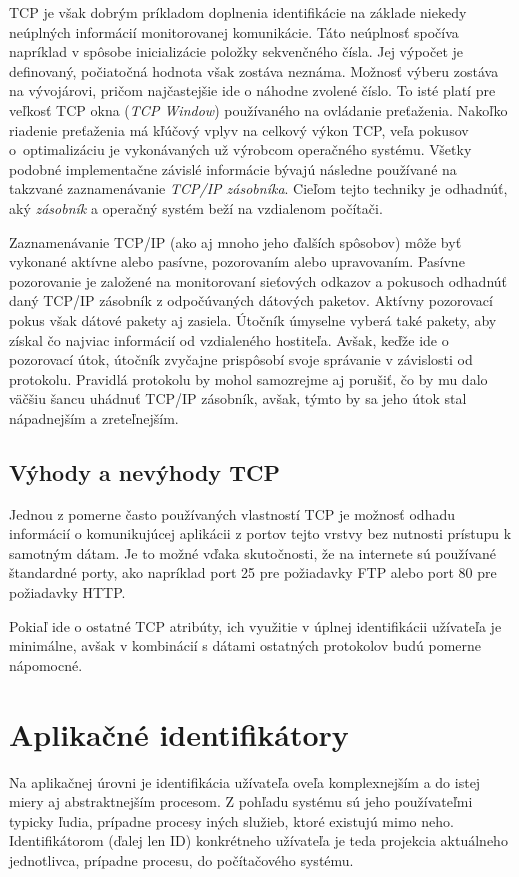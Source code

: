\documentclass[
  digital, %
  table,   %
  lof,     %
  nolot,   %
  nocover
]{fithesis3}
\begin{document}
TCP je však dobrým príkladom doplnenia identifikácie na základe niekedy neúplných
informácií monitorovanej komunikácie. Táto neúplnosť spočíva napríklad v
spôsobe inicializácie položky sekvenčného čísla. Jej výpočet je definovaný,
počiatočná hodnota však zostáva neznáma. Možnosť výberu zostáva na vývojárovi,
pričom najčastejšie ide o náhodne zvolené číslo. To isté platí pre veľkosť TCP
okna (\textit{TCP Window}) používaného na ovládanie preťaženia. Nakoľko
riadenie preťaženia má kľúčový vplyv na celkový výkon TCP, veľa pokusov
o~optimalizáciu je vykonávaných už výrobcom operačného systému.
Všetky podobné implementačne závislé informácie bývajú následne používané na takzvané
zaznamenávanie \textit{TCP/IP zásobníka}. Cieľom tejto techniky je odhadnúť,
aký \textit{zásobník} a operačný systém beží na vzdialenom počítači.

Zaznamenávanie TCP/IP (ako aj mnoho jeho ďalších spôsobov) môže byť vykonané
aktívne alebo pasívne, pozorovaním alebo upravovaním. Pasívne pozorovanie je
založené na monitorovaní sieťových odkazov a pokusoch odhadnúť daný TCP/IP
zásobník z odpočúvaných dátových paketov. Aktívny pozorovací pokus však dátové
pakety aj zasiela. Útočník úmyselne vyberá také pakety, aby získal čo najviac
informácií od vzdialeného hostiteľa. Avšak, keďže ide o pozorovací útok,
útočník zvyčajne prispôsobí svoje správanie v závislosti od protokolu. Pravidlá
protokolu by mohol samozrejme aj porušiť, čo by mu dalo väčšiu šancu uhádnuť
TCP/IP zásobník, avšak, týmto by sa jeho útok stal nápadnejším a zreteľnejším.
 
\subsection{Výhody a nevýhody TCP}
Jednou z pomerne často používaných vlastností TCP je možnosť odhadu informácií
o komunikujúcej aplikácii z portov tejto vrstvy bez nutnosti prístupu k samotným
dátam. Je to možné vďaka skutočnosti, že na internete sú používané štandardné
porty, ako napríklad port 25 pre požiadavky FTP alebo port 80 pre požiadavky HTTP.

Pokiaľ ide o ostatné TCP atribúty, ich využitie v úplnej identifikácii
užívateľa je minimálne, avšak v kombinácií s dátami ostatných protokolov budú
pomerne nápomocné.

\section{Aplikačné identifikátory}
Na aplikačnej úrovni je identifikácia užívateľa oveľa komplexnejším a do istej
miery aj abstraktnejším procesom. Z pohľadu systému sú jeho používateľmi
typicky ľudia, prípadne procesy iných služieb, ktoré existujú mimo neho.
Identifikátorom (ďalej len ID) konkrétneho užívateľa je teda projekcia aktuálneho
jednotlivca, prípadne procesu, do počítačového systému.
\end{document}
